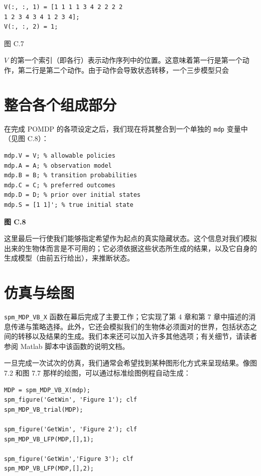 \begin{verbatim}
V(:, :, 1) = [1 1 1 1 3 4 2 2 2 2
1 2 3 4 3 4 1 2 3 4];
V(:, :, 2) = 1;
\end{verbatim}

图 C.7

$V$ 的第一个索引（即各行）表示动作序列中的位置。这意味着第一行是第一个动作，第二行是第二个动作。由于动作会导致状态转移，一个三步模型只会

\section{整合各个组成部分}

在完成 POMDP 的各项设定之后，我们现在将其整合到一个单独的 \verb|mdp| 变量中（见图 C.8）：

\begin{verbatim}
mdp.V = V; % allowable policies
mdp.A = A; % observation model
mdp.B = B; % transition probabilities
mdp.C = C; % preferred outcomes
mdp.D = D; % prior over initial states
mdp.S = [1 1]'; % true initial state
\end{verbatim}

\noindent\textbf{图 C.8}

这里最后一行使我们能够指定希望作为起点的真实隐藏状态。这个信息对我们模拟出来的生物体而言是不可用的；它必须依据这些状态所生成的结果，以及它自身的生成模型（由前五行给出），来推断状态。

\section{仿真与绘图}

\verb|spm_MDP_VB_X| 函数在幕后完成了主要工作；它实现了第 4 章和第 7 章中描述的消息传递与策略选择。此外，它还会模拟我们的生物体必须面对的世界，包括状态之间的转移以及结果的生成。我们本来还可以加入许多其他选项；有关细节，请读者参阅 Matlab 脚本中该函数的说明文档。

一旦完成一次试次的仿真，我们通常会希望找到某种图形化方式来呈现结果。像图 7.2 和图 7.7 那样的绘图，可以通过标准绘图例程自动生成：

\begin{verbatim}
MDP = spm_MDP_VB_X(mdp);
spm_figure('GetWin', 'Figure 1'); clf
spm_MDP_VB_trial(MDP);

spm_figure('GetWin', 'Figure 2'); clf
spm_MDP_VB_LFP(MDP,[],1);

spm_figure('GetWin','Figure 3'); clf
spm_MDP_VB_LFP(MDP,[],2);
\end{verbatim}

